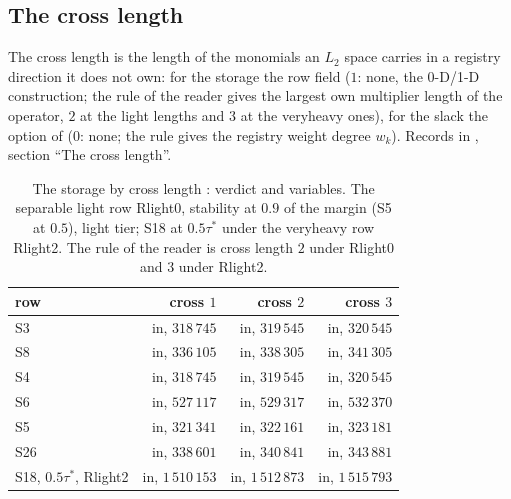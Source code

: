 \subsection{The cross length}\label{sec:bl-cross}

The cross length is the length of the monomials an $L_2$ space carries in a registry direction it does not own: for the storage the row field  ($1$: none, the 0-D/1-D construction; the rule of the reader gives the largest own multiplier length of the operator, $2$ at the light lengths and $3$ at the veryheavy ones), for the slack the option  of  ($0$: none; the rule gives the registry weight degree $w_k$). Records in , section ``The cross length''.

\begin{table}[h]\centering\scriptsize
\setlength{\tabcolsep}{4pt}
\begin{tabular}{lrrr}
\toprule
row & cross $1$ & cross $2$ & cross $3$ \\
\midrule
S3 & in, $318\,745$ & in, $319\,545$ & in, $320\,545$ \\
S8 & in, $336\,105$ & in, $338\,305$ & in, $341\,305$ \\
S4 & in, $318\,745$ & in, $319\,545$ & in, $320\,545$ \\
S6 & in, $527\,117$ & in, $529\,317$ & in, $532\,370$ \\
S5 & in, $321\,341$ & in, $322\,161$ & in, $323\,181$ \\
S26 & in, $338\,601$ & in, $340\,841$ & in, $343\,881$ \\
S18, $0.5\tau^*$, Rlight2 & in, $1\,510\,153$ & in, $1\,512\,873$ & in, $1\,515\,793$ \\
\bottomrule
\end{tabular}
\caption{The storage by cross length : verdict and variables. The separable light row Rlight0, stability  at $0.9$ of the margin (S5 at $0.5$), light tier; S18 at $0.5\tau^*$ under the veryheavy row Rlight2. The rule of the reader is cross length $2$ under Rlight0 and $3$ under Rlight2.}\label{tab:bl-cross-storage}
\end{table}

